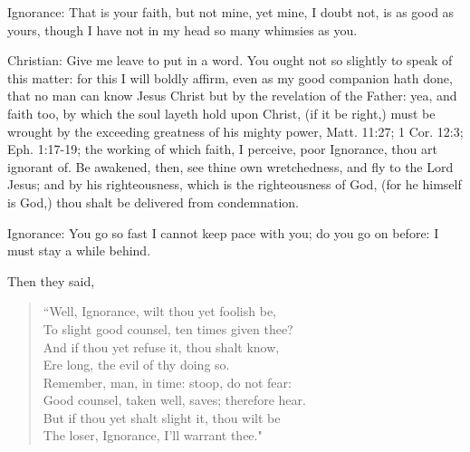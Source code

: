 Ignorance: That is your faith, but not mine, yet mine, I doubt not, is as good as yours, though I have not in my head so many whimsies as you.

Christian: Give me leave to put in a word. You ought not so slightly to speak of this matter: for this I will boldly affirm, even as my good companion hath done, that no man can know Jesus Christ but by the revelation of the Father: yea, and faith too, by which the soul layeth hold upon Christ, (if it be right,) must be wrought by the exceeding greatness of his mighty power, Matt. 11:27; 1 Cor. 12:3; Eph. 1:17-19; the working of which faith, I perceive, poor Ignorance, thou art ignorant of. Be awakened, then, see thine own wretchedness, and fly to the Lord Jesus; and by his righteousness, which is the righteousness of God, (for he himself is God,) thou shalt be delivered from condemnation.

Ignorance: You go so fast I cannot keep pace with you; do you go on before: I must stay a while behind.

Then they said,
\begin{verse}
``Well, Ignorance, wilt thou yet foolish be,\\
To slight good counsel, ten times given thee?\\
And if thou yet refuse it, thou shalt know,\\
Ere long, the evil of thy doing so.\\
Remember, man, in time: stoop, do not fear:\\
Good counsel, taken well, saves; therefore hear.\\
But if thou yet shalt slight it, thou wilt be\\
The loser, Ignorance, I'll warrant thee."\\
\end{verse}
